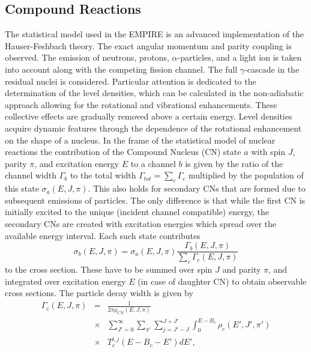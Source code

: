 \documentclass[twocolumn,amsmath,amssymb,10pt,groupedaddress,a4paper]{revtex4}
\begin{document}
\subsection{Compound Reactions}


The statistical model used in the EMPIRE is an advanced implementation
of the Hauser-Feshbach theory. The exact angular
momentum and parity coupling is observed. The emission of neutrons,
protons, $\alpha$-particles, and a light ion is taken into account
along with the competing fission channel. The full $\gamma$-cascade
in the residual nuclei is considered. Particular attention is dedicated
to the determination of the level densities,
which can be calculated in the non-adiabatic approach allowing for
the rotational and vibrational enhancements. These collective effects
are gradually removed above a certain energy. Level densities acquire
dynamic features through the dependence of the rotational enhancement
on the shape of a nucleus.
In the frame of the statistical model of nuclear reactions the contribution
of the Compound Nucleus (CN) state $a$ with spin $J$, parity $\pi$,
and excitation energy $E$ to a channel $b$ is given by the ratio
of the channel width $\Gamma_{b}$ to the total width $\Gamma_{tot}=\sum_{c}\Gamma_{c}$
multiplied by the population of this state $\sigma_{a}(E,J,\pi)$.
This also holds for secondary CNs that are formed due to subsequent
emissions of particles. The only difference is that while the first
CN is initially excited to the unique (incident channel compatible)
energy, the secondary CNs are created with excitation energies which
spread over the available energy interval. Each such state contributes
\noindent
\begin{equation}
\sigma_{b}(E,J,\pi)=\sigma_{a}(E,J,\pi)\frac{\Gamma_{b}(E,J,\pi)}{\sum_{c}\Gamma_{c}(E,J,\pi)}
\label{Hauser}
\end{equation}
to the cross section. These have to be summed over spin $J$ and parity
$\pi$, and integrated over excitation energy $E$ (in case of daughter
CN) to obtain observable cross sections. The particle decay width
is given by
\begin{eqnarray}
\Gamma_{c}(E,J,\pi)&=&\frac{1}{2\pi\rho_{CN}(E,J,\pi)}\nonumber\\
&\times&\sum_{J'=0}^{\infty}\sum_{\pi'}\sum_{j=J'-J}^{J+J'}\int_{0}^{E-B_{c}}\rho_{c}(E',J',\pi')\nonumber\\
&\times&T_{c}^{l,j}(E-B_{c}-E')dE',\label{pwidth}
\end{eqnarray}
\end{document}
